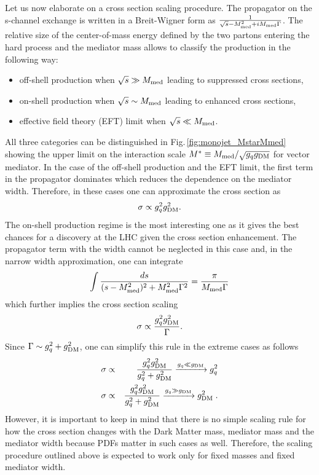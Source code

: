 Let us now elaborate on a cross section scaling procedure.
The propagator on the s-channel exchange is written in a Breit-Wigner form as $\frac{1}{\sqrt{s}-M_{\rm{med}}^2 + iM_{\rm{med}}\Gamma}$. The relative size of the center-of-mass energy defined by the two partons entering the hard process and the mediator mass allows to classify the production in the following way:
\begin{itemize}
\item off-shell production when $\sqrt{s} \gg M_{\rm{med}}$ leading to suppressed cross sections,
\item on-shell production when $\sqrt{s} \sim M_{\rm{med}}$ leading to enhanced cross sections,
\item effective field theory (EFT) limit when $\sqrt{s} \ll M_{\rm{med}}$.
\end{itemize}
All three categories can be distinguished in Fig.\,\ref{fig:monojet_MstarMmed} showing the upper limit on the interaction scale $M^{*} \equiv M_{\rm{med}}/\sqrt{g_qg_{\rm{DM}}}$ for vector mediator. 
In the case of the off-shell production and the EFT limit, the first term in the propagator dominates which reduces the dependence on the mediator width. Therefore, in these cases one can approximate the cross section as
\begin{equation}
\sigma \propto g_q^2g_{\rm{DM}}^2.
\end{equation}
The on-shell production regime is the most interesting one as it gives the best chances for a discovery at the LHC given the cross section enhancement. The propagator term with the width cannot be neglected in this case and, in the narrow width approximation, one can integrate
\begin{equation}
\int \frac{ds}{(s-M_{\rm{med}}^2)^2 + M_{\rm{med}}^2\Gamma^2} = \frac{\pi}{M_{\rm{med}}\Gamma}
\end{equation}
which further implies the cross section scaling
\begin{equation}
\sigma \propto \frac{g_q^2\gDM^2}{\Gamma}.
\label{eq:monojet_scaling}
\end{equation}
Since $\Gamma \sim g_q^2+g_{\rm{DM}}^2$, one can simplify this rule in the extreme cases as follows
\begin{eqnarray}
\sigma &\propto& \frac{g_q^2\gDM^2}{g_q^2+\gDM^2} \xrightarrow{g_q \ll \gDM} g_q^2 \label{eq:monojet_gSM} \\
\sigma &\propto& \frac{g_q^2\gDM^2}{g_q^2+\gDM^2} \xrightarrow{g_q \gg \gDM} \gDM^2 \label{eq:monojet_gDM} \;.
\end{eqnarray}
However, it is important to keep in mind that there is no simple scaling rule for how the cross section changes with the Dark Matter mass, mediator mass and the mediator width because PDFs matter in such cases as well.
Therefore, the scaling procedure outlined above is expected to work only for fixed masses and fixed mediator width.


